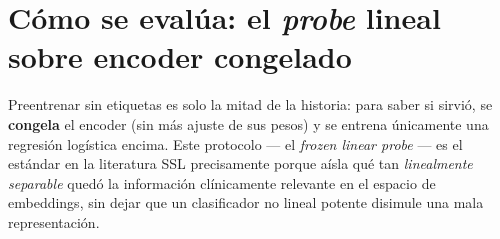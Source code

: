 \documentclass[11pt,a4paper]{article}
\begin{document}
\section{Cómo se evalúa: el \emph{probe} lineal sobre encoder congelado}
\label{sec:probe}

Preentrenar sin etiquetas es solo la mitad de la historia: para saber si
sirvió, se \textbf{congela} el encoder (sin más ajuste de sus pesos) y se
entrena únicamente una regresión logística encima. Este protocolo --- el
\emph{frozen linear probe} --- es el estándar en la literatura SSL
precisamente porque aísla qué tan \emph{linealmente separable} quedó la
información clínicamente relevante en el espacio de embeddings, sin dejar
que un clasificador no lineal potente disimule una mala representación.
\end{document}
